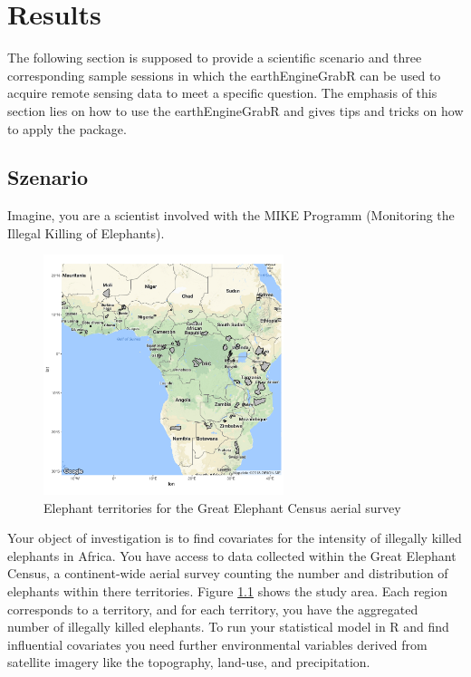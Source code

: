 \chapter{Results}

The following section is supposed to provide a scientific scenario and three corresponding sample sessions in which the earthEngineGrabR can be used to acquire remote sensing data to meet a specific question. The emphasis of this section lies on how to use the earthEngineGrabR and gives tips and tricks on how to apply the package.

\section{Szenario}

Imagine, you are a scientist involved with the MIKE Programm (Monitoring the Illegal Killing of Elephants). 


\begin{figure}
	\begin{center}
		\includegraphics[width=7cm]{images/territories.pdf}
	\end{center}
	\caption{Elephant territories for the Great Elephant Census aerial survey}
	\label{territories}
\end{figure}

Your object of investigation is to find covariates for the intensity of illegally killed elephants in Africa. You have access to data collected within the Great Elephant Census, a continent-wide aerial survey counting the number and distribution of elephants within there territories. Figure \ref{territories} shows the study area. Each region corresponds to a territory, and for each territory, you have the aggregated number of illegally killed elephants. To run your statistical model in R and find influential covariates you need further environmental variables derived from satellite imagery like the topography, land-use, and precipitation. 


